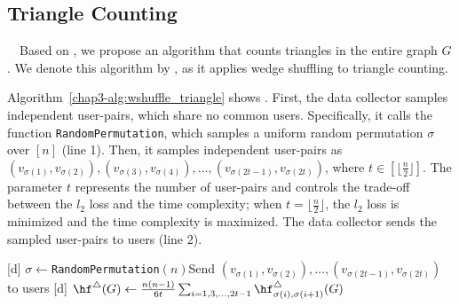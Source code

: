 \subsection{Triangle Counting}
\label{chap3-sub:triangle}
~~Based on 
\AlgWSLE{}, 
we propose an algorithm that counts triangles in the entire graph $G$. 
We denote this algorithm by \AlgWSTri{}, as it applies wedge shuffling to triangle counting. 

Algorithm~\ref{chap3-alg:wshuffle_triangle} shows \AlgWSTri{}. 
First, the data collector samples independent user-pairs, which share no common users. 
Specifically, it calls the function \texttt{RandomPermutation}, which samples a uniform random permutation $\sigma$ over $[n]$ (line 1). 
Then, it samples independent user-pairs as 
$(v_{\sigma(1)}, v_{\sigma(2)}), (v_{\sigma(3)}, v_{\sigma(4)}), \ldots, (v_{\sigma(2t-1)}, v_{\sigma(2t)})$, where $t \in [\lfloor \frac{n}{2} \rfloor]$. 
The parameter $t$ represents the number of user-pairs and controls the trade-off between the $l_2$ loss and the time complexity; 
when $t = \lfloor \frac{n}{2} \rfloor$, the $l_2$ loss is minimized and the time complexity is maximized. 
The data collector sends the sampled user-pairs to users (line 2).

\setlength{\algomargin}{5mm}
\begin{algorithm}[t]
  \SetAlgoLined
  [d] $\sigma \leftarrow$\texttt{RandomPermutation}$(n)$\;
  [d] Send $(v_{\sigma(1)}, v_{\sigma(2)}), \ldots, (v_{\sigma(2t-1)}, v_{\sigma(2t)})$ to users\;
  [d] $\hf^\triangle(G) \leftarrow \frac{n(n-1)}{6t} \sum_{i=1, 3, \ldots, 2t-1} \hf_{\sigma(i),\sigma(i+1)}^\triangle(G)$\;
  \caption{Our triangle counting algorithm \AlgWSTri{}. 
  \AlgWSLE{} is shown in Algorithm~\ref{chap3-alg:WSLE}. 
  }\label{chap3-alg:wshuffle_triangle}
\end{algorithm}

